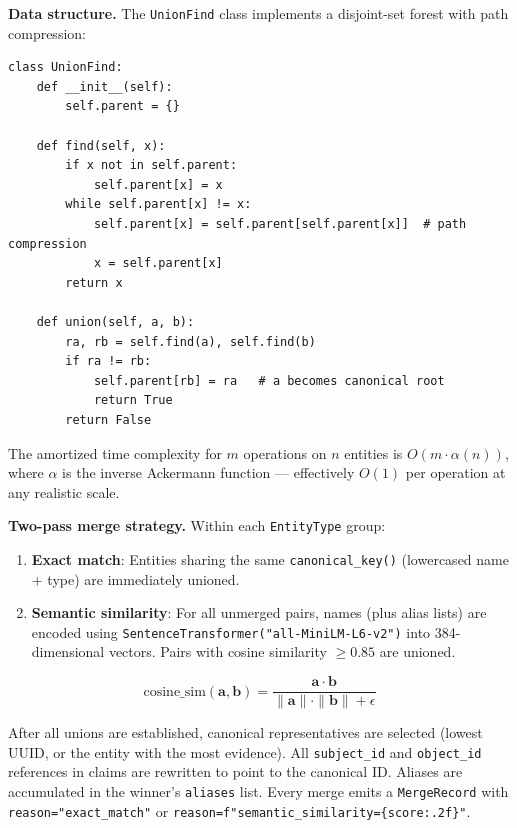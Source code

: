 \documentclass[12pt,a4paper]{article}
\begin{document}
\textbf{Data structure.} The \texttt{UnionFind} class implements a disjoint-set forest with path compression:

\begin{lstlisting}[caption=UnionFind with path compression (03\_dedup.py)]
class UnionFind:
    def __init__(self):
        self.parent = {}

    def find(self, x):
        if x not in self.parent:
            self.parent[x] = x
        while self.parent[x] != x:
            self.parent[x] = self.parent[self.parent[x]]  # path compression
            x = self.parent[x]
        return x

    def union(self, a, b):
        ra, rb = self.find(a), self.find(b)
        if ra != rb:
            self.parent[rb] = ra   # a becomes canonical root
            return True
        return False
\end{lstlisting}

The amortized time complexity for $m$ operations on $n$ entities is $O(m \cdot \alpha(n))$, where $\alpha$ is the inverse Ackermann function — effectively $O(1)$ per operation at any realistic scale.

\textbf{Two-pass merge strategy.} Within each \texttt{EntityType} group:

\begin{enumerate}
    \item \textbf{Exact match}: Entities sharing the same \texttt{canonical\_key()} (lowercased name + type) are immediately unioned.
    \item \textbf{Semantic similarity}: For all unmerged pairs, names (plus alias lists) are encoded using \texttt{SentenceTransformer("all-MiniLM-L6-v2")} into 384-dimensional vectors. Pairs with cosine similarity $\geq 0.85$ are unioned.
\end{enumerate}

$$\text{cosine\_sim}(\mathbf{a}, \mathbf{b}) = \frac{\mathbf{a} \cdot \mathbf{b}}{\|\mathbf{a}\| \cdot \|\mathbf{b}\| + \epsilon}$$

After all unions are established, canonical representatives are selected (lowest UUID, or the entity with the most evidence). All \texttt{subject\_id} and \texttt{object\_id} references in claims are rewritten to point to the canonical ID. Aliases are accumulated in the winner's \texttt{aliases} list. Every merge emits a \texttt{MergeRecord} with \texttt{reason="exact\_match"} or \texttt{reason=f"semantic\_similarity=\{score:.2f\}"}.

\end{document}
